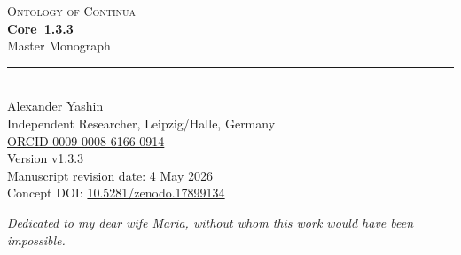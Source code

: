\begin{titlepage}
\label{sec:oc133-title-page}
\thispagestyle{empty}
\begin{center}
\vspace*{1.0cm}
{\sffamily\Large\color{ocTitleBlue}\textsc{Ontology of Continua}}\\[0.38cm]
{\sffamily\Huge\bfseries Core~1.3.3}\\[0.28cm]
{\sffamily\Large Master Monograph}\\[0.75cm]
{\color{ocTitleGold}\rule{0.42\textwidth}{0.5pt}}\\[0.95cm]

{\Large Alexander Yashin}\\[0.2cm]
{\normalsize Independent Researcher, Leipzig/Halle, Germany}\\[0.2cm]
{\normalsize \href{https://orcid.org/0009-0008-6166-0914}{ORCID 0009-0008-6166-0914}}\\[1.0cm]

{\normalsize Version v1.3.3}\\[0.3cm]
{\normalsize Manuscript revision date: 4 May 2026}\\[0.3cm]
{\normalsize Concept DOI: \href{https://doi.org/10.5281/zenodo.17899134}{10.5281/zenodo.17899134}}\\[0.9cm]

\vfill

{\small\itshape Dedicated to my dear wife Maria, without whom this work would have been impossible.}\\[0.8cm]
\end{center}
\end{titlepage}

